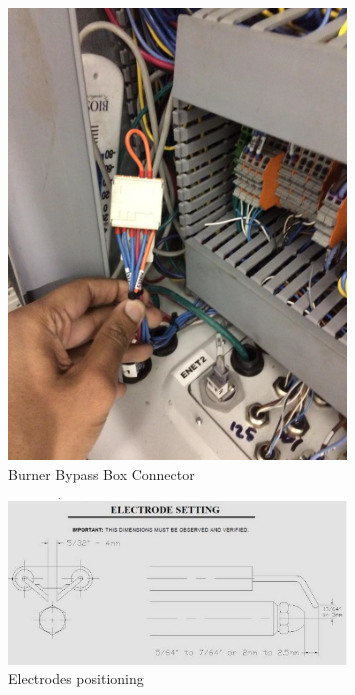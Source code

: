 \begin{figure}[H]
        \centering
        \includegraphics[width=0.8\textwidth]{pictures/burner_box/cab1_connected.jpg}
        \caption{Burner Bypass Box Connector}
        \label{fig:cab1_connector}
\end{figure}

\begin{figure}[H]
        \centering
        \includegraphics[width=0.8\textwidth]{pictures/burner_box/electrodes.jpg}
        \caption{Electrodes positioning}
        \label{fig:electrodes}
\end{figure}

